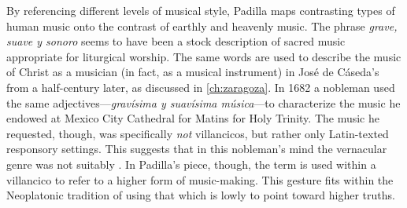 By referencing different levels of musical style, Padilla maps contrasting types
of human music onto the contrast of earthly and heavenly music.
The phrase \emph{grave, suave y sonoro} seems to have been a stock description
of sacred music appropriate for liturgical worship.%
    \Autocite
    [On \emph{suave} and other common vocabulary used to evoke music in Spanish
    poetry of the period, see][]{UribeBracho:OrfeoPhD}
The same words are used to describe the music of Christ as a musician (in fact,
as a musical instrument) in José de Cáseda's  from a
half-century later, as discussed in \cref{ch:zaragoza}.
In 1682 a nobleman used the same adjectives---\emph{gravísima y suavísima
música}---to characterize the music he endowed at Mexico City Cathedral for
Matins for Holy Trinity.%
    \Autocite[140--141]{Goldman:Responsory}
The music he requested, though, was specifically \emph{not} villancicos, but
rather only Latin-texted responsory settings.
This suggests that in this nobleman's mind the vernacular genre was not suitably
.
In Padilla's piece, though, the term is used within a villancico to refer to a
higher form of music-making. 
This gesture fits within the Neoplatonic tradition of using that which is lowly
to point toward higher truths.

